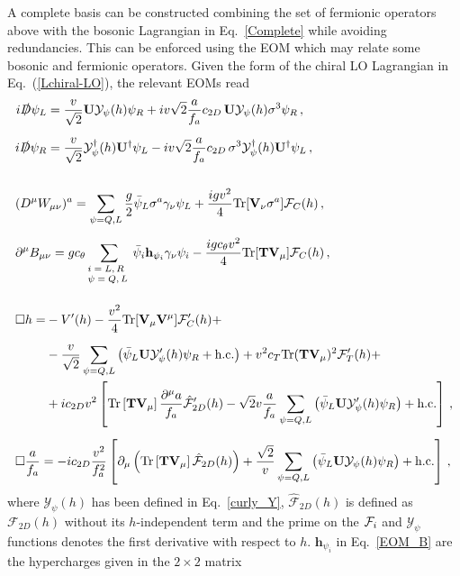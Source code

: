 \documentclass[11pt]{article}
\newcommand{\g}{\gamma}
\newcommand{\s}{\sigma}
\newcommand{\F}{\mathcal{F}}
\newcommand{\T}{\mathbf{T}}
\newcommand{\U}{\mathbf{U}}
\newcommand{\V}{\mathbf{V}}
\newcommand{\BBd}{B_{\mu\nu}}
\newcommand{\WWd}{W_{\mu\nu}}
\newcommand{\ct}{c_\theta}
\newcommand{\tr}{{\rm Tr}}
\newcommand{\de}{\partial}
\newcommand{\nn}{\nonumber}
\renewcommand{\[}{\begin{equation}}
\renewcommand{\]}{\end{equation}}
\newcommand{\TL}{\mathbf{T}}
\newcommand{\VL}{\mathbf{V}}
\def\cF{{\cal F}}
\begin{document}
\begin{appendices}
A complete basis can be constructed combining the set of fermionic operators above with the bosonic Lagrangian in Eq.~\eqref{Complete} while avoiding redundancies. This can be enforced using the EOM which may relate some bosonic and fermionic operators. Given the form of the chiral LO Lagrangian in Eq.~(\ref{Lchiral-LO}), the relevant EOMs read 
\begin{align}
&\begin{aligned}
 i\slashed{D}\psi_L& =  \frac{v}{\sqrt{2}} \U \mathcal{Y}_\psi(h)  \psi_R +iv\sqrt2\frac{a}{f_a}c_{2D}\,\U\mathcal{Y}_\psi(h)\s^3\psi_R\,,\\[2mm]
 i\slashed{D}\psi_R&=  \frac{v}{\sqrt{2}} \mathcal{Y}^\dag_\psi(h) \U^\dag\psi_L  -iv\sqrt2\frac{a}{f_a}c_{2D}\,\s^3 \mathcal{Y}^\dag_\psi(h) \U^\dag\psi_L\,,
\label{EOM_psi}
 \end{aligned}\\
 \nn\\
& (D^\mu\WWd)^a = \sum_{\psi=Q,L}\frac{g}{2}\bar{\psi}_L\s^a \g_\nu \psi_L 
+\dfrac{igv^2}{4}\tr[\V_\nu \s^a] \cF_C(h)\label{EOM_W}\,,\\[2mm]
& \de^\mu \BBd =g\ct\sum_{\parbox{12mm}{\scriptsize$i=L,R$\\
$\psi=Q,L$}} \bar{\psi}_i\mathbf{h}_{\psi_i}\g_\nu \psi_i 
-\frac{ig\ct v^2}{4}\tr[\T\V_\mu]\cF_C(h)\label{EOM_B}\,,\\
 \nn\\
&\begin{aligned}
\square h =& - V'(h)-\frac{v^2}{4}\tr[\V_\mu\V^\mu]  
\cF'_C(h)+\\[2mm]
&-\frac{v}{\sqrt2}\sum_{\psi=Q,L}\left(\bar\psi_L\U\mathcal{Y}'_\psi(h)
\psi_R+\text{h.c.}\right)+v^2 c_T\tr(\TL\VL_\mu)^2\cF'_T(h)+\\
&+ic_{2D}v^2\left[ \tr\left[\T\V_\mu\right] \frac{\de^\mu a}{f_a} \hat{\F}'_{2D}(h)-\sqrt{2}{v}\frac{a}{f_a}\sum_{\psi=Q,L }\left(\bar\psi_L\U\mathcal{Y}'_\psi(h) \psi_R\right)+\text{h.c.}\right]\,,\label{EOM_h} \\
\end{aligned} \\[2mm] 
%
&\square \frac{a}{f_a}=-ic_{2D}\frac{v^2}{f_a^2}\left[\partial_\mu\left(\tr\left[\T\V_\mu\right]\hat{\cF}_{2D}(h)\right)+\frac{\sqrt2}{v}\sum_{\psi=Q,L}\left(\bar\psi_L\U\mathcal{Y}_\psi(h) \psi_R\right)+\text{h.c.}\right]\,, \label{EOM_a}
\end{align}
%
where $\mathcal{Y}_\psi(h)$ has been defined in Eq.~\eqref{curly_Y}, $\hat{\F}_{2D}(h)$ is defined as $\F_{2D}(h)$ without its $h$-independent term and the prime on the $\cF_i$ and $\mathcal{Y}_\psi$ functions denotes the first derivative with respect to $h$.  $\mathbf{h}_{\psi_i}$  in Eq.~\eqref{EOM_B} are the hypercharges given in the $2\times2$ matrix 

\end{appendices}
\end{document}
